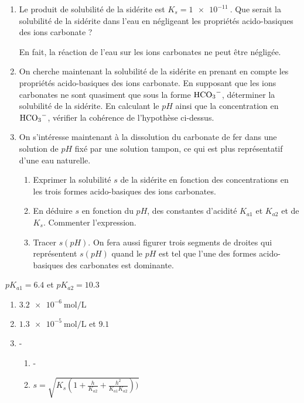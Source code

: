 \begin{enumerate}
	\item Le produit de solubilité de la sidérite est $K_s = \SI{1e-11}{}$. Que serait la solubilité de la sidérite dans l'eau en négligeant les propriétés acido-basiques des ions carbonate ?
	
	En fait, la réaction de l'eau sur les ions carbonates ne peut être négligée.
	
	\item On cherche maintenant la solubilité de la sidérite en prenant en compte les propriétés acido-basiques des ions carbonate. En supposant que les ions carbonates ne sont quasiment que sous la forme $\ce{HCO3-}$, déterminer la solubilité de la sidérite. En calculant le $pH$ ainsi que la concentration en $\ce{HCO3-}$, vérifier la cohérence de l'hypothèse ci-dessus.
	
	\item On s'intéresse maintenant à la dissolution du carbonate de fer dans une solution de $pH$ fixé par une solution tampon, ce qui est plus représentatif d'une eau naturelle.
	\begin{enumerate}
		\item Exprimer la solubilité $s$ de la sidérite en fonction des concentrations en les trois formes acido-basiques des ions carbonates.
		\item En déduire $s$ en fonction du $pH$, des constantes d'acidité $K_{a1}$ et $K_{a2}$ et de $K_s$. Commenter l'expression.
		\item Tracer $s(pH)$. On fera aussi figurer trois segments de droites qui représentent $s(pH)$ quand le $pH$ est tel que l'une des formes acido-basiques des carbonates est dominante.
	\end{enumerate}
\end{enumerate}

 $pK_{a1} = 6.4$ et $pK_{a2} = 10.3$ 

\begin{enumerate}
	\item $\SI{3.2e-6}{\mole\per\liter}$
	\item $\SI{1.3e-5}{\mole\per\liter}$ et $9.1$
	\item -
	\begin{enumerate}
		\item -
		\item $s = \sqrt{K_s\left(1 + \frac{h}{K_{a2}} + \frac{h^2}{K_{a1}K_{a2}} \right))}$
	\end{enumerate}
\end{enumerate}